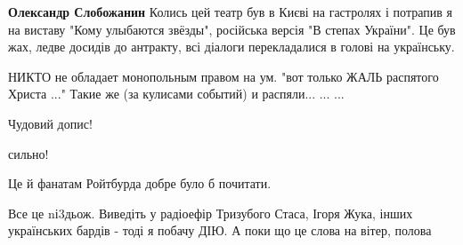 \begin{itemize}
\begin{itemize}
\textbf{Олександр Слобожанин} Колись цей театр був в Києві на гастролях і
потрапив я на виставу "Кому улыбаются звёзды", російська версія "В степах
України". Це був жах, ледве досидів до антракту, всі діалоги перекладалися в
голові на українську.
\end{itemize}

 
НИКТО не обладает монопольным правом на ум.
"вот только ЖАЛЬ распятого Христа ..."
Такие же (за кулисами событий) и распяли... ... ...

 
Чудовий допис!

 
сильно!

 
Це й фанатам Ройтбурда добре було б почитати.

 

Все це nі3дьож. Виведіть у радіоефір Тризубого Стаса, Ігоря Жука, інших
українських бардів - тоді я побачу ДІЮ. А поки що це слова на вітер, полова


 


\end{itemize}

